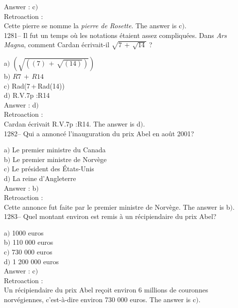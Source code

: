 ﻿\documentclass[letterpaper, 12pt]{article}
\begin{document}
Answer : c$)$\\

Retroaction : \\
Cette pierre se nomme la {\sl pierre de Rosette}.
The answer is  c$)$.\\

1281-- Il fut un temps o\`u les notations \'etaient assez
compliqu\'ees. Dans {\sl Ars Magna}, comment Cardan \'ecrivait-il
$\sqrt{7\,+\,\sqrt{14}}$ ?

a$)$ $(\sqrt{((7)\,+\,\sqrt{(14)})})$ \\[2mm]
b$)$ $R7\,+\,R14$ \\[2mm]
c$)$ Rad(7\,+\,Rad(14)) \\[2mm]
d$)$ R.V.7p :R14\\

Answer : d$)$\\

Retroaction : \\
Cardan \'ecrivait R.V.7p :R14.
The answer is  d$)$.\\

1282-- Qui a annonc\'e l'inauguration du prix Abel en ao\^ut 2001?

a$)$ Le premier ministre du Canada \\
b$)$ Le premier ministre de Norv\`ege \\
c$)$ Le pr\'esident des \'Etats-Unis \\
d$)$ La reine d'Angleterre\\

Answer : b$)$\\

Retroaction : \\
Cette annonce fut faite par le premier ministre de Norv\`ege.
The answer is  b$)$.\\

1283-- Quel montant environ est remis \`a un r\'ecipiendaire du prix
Abel?

a$)$ 1000 euros \\
b$)$ 110 000 euros \\
c$)$ 730 000 euros \\
d$)$ 1 200 000 euros\\

Answer : c$)$\\

Retroaction : \\
Un r\'ecipiendaire du prix Abel re\c coit environ 6 millions de
couronnes norv\'egiennes,  c'est-\`a-dire environ 730 000 euros.
The answer is  c$)$.\\
\end{document}

